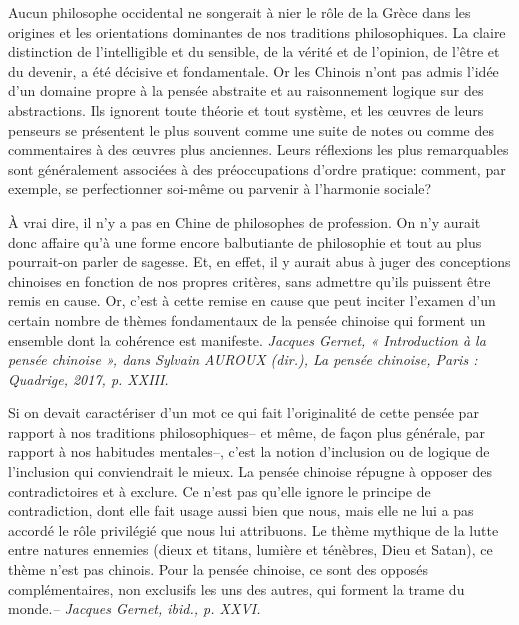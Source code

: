 \begin{singlequote}
    Aucun philosophe occidental ne songerait à nier le rôle de la Grèce dans les origines et les orientations dominantes de nos traditions philosophiques. La claire distinction de l’intelligible et du sensible, de la vérité et de l’opinion, de l’être et du devenir, a été décisive et fondamentale. Or les Chinois n’ont pas admis l’idée d’un domaine propre à la pensée abstraite et au raisonnement logique sur des abstractions. Ils ignorent toute théorie et tout système, et les œuvres de leurs penseurs se présentent le plus souvent comme une suite de notes ou comme des commentaires à des œuvres plus anciennes. Leurs réflexions les plus remarquables sont généralement associées à des préoccupations d’ordre pratique: comment, par exemple, se perfectionner soi-même ou parvenir à l’harmonie sociale?
 
À vrai dire, il n’y a pas en Chine de philosophes de profession. On n’y aurait donc affaire qu’à une forme encore balbutiante de philosophie et tout au plus pourrait-on parler de sagesse.
Et, en effet, il y aurait abus à juger des conceptions chinoises en fonction de nos propres critères, sans admettre qu’ils puissent être remis en cause. Or, c’est à cette remise en cause que peut inciter l’examen d’un certain nombre de thèmes fondamentaux de la pensée chinoise qui forment un ensemble dont la cohérence est manifeste.
\textit{Jacques Gernet, « Introduction à la pensée chinoise », dans Sylvain AUROUX (dir.), La pensée chinoise,
Paris : Quadrige, 2017, p. XXIII.
}

\end{singlequote}

\begin{singlequote}
    Si on devait caractériser d’un mot ce qui fait l’originalité de cette pensée par rapport à nos traditions philosophiques– et même, de façon plus générale, par rapport à nos habitudes mentales–, c’est la notion d’inclusion ou de logique de l’inclusion qui conviendrait le mieux. La pensée chinoise répugne à opposer des contradictoires et à exclure. Ce n’est pas qu’elle ignore le principe de contradiction, dont elle fait usage aussi bien que nous, mais elle ne lui a pas accordé le rôle privilégié que nous lui attribuons. Le thème mythique de la lutte entre natures ennemies (dieux et titans, lumière et ténèbres, Dieu et Satan), ce thème n’est pas chinois. Pour la pensée chinoise, ce sont des opposés complémentaires, non exclusifs les uns des autres, qui forment la trame du monde.\textit{-- Jacques Gernet, ibid., p. XXVI.}
\end{singlequote}


